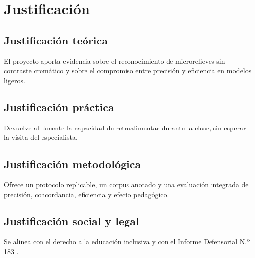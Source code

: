 \section{Justificación}

\subsection{Justificación teórica}
El proyecto aporta evidencia sobre el reconocimiento de microrelieves sin
contraste cromático y sobre el compromiso entre precisión y eficiencia en
modelos ligeros.

\subsection{Justificación práctica}
Devuelve al docente la capacidad de retroalimentar durante la clase, sin esperar
la visita del especialista.

\subsection{Justificación metodológica}
Ofrece un protocolo replicable, un corpus anotado y una evaluación integrada de
precisión, concordancia, eficiencia y efecto pedagógico.

\subsection{Justificación social y legal}
Se alinea con el derecho a la educación inclusiva y con el Informe Defensorial
N.º 183 \parencite{defensoria2019}.
